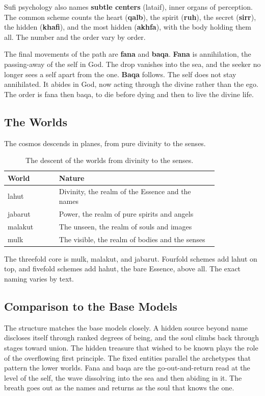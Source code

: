 Sufi psychology also names \textbf{subtle centers} (lataif), inner organs of
perception. The common scheme counts the heart (\textbf{qalb}), the spirit
(\textbf{ruh}), the secret (\textbf{sirr}), the hidden (\textbf{khafi}), and the
most hidden (\textbf{akhfa}), with the body holding them all. The number and
the order vary by order.

The final movements of the path are \textbf{fana} and \textbf{baqa}.
\textbf{Fana} is annihilation, the passing-away of the self in God. The drop
vanishes into the sea, and the seeker no longer sees a self apart from the one.
\textbf{Baqa} follows. The self does not stay annihilated. It abides in God,
now acting through the divine rather than the ego. The order is fana then baqa,
to die before dying and then to live the divine life.

\subsection{The Worlds}

The cosmos descends in planes, from pure divinity to the senses.

\begin{longtable}{L{0.20\linewidth} L{0.62\linewidth}}
\caption{The descent of the worlds from divinity to the senses.}\\
\toprule
World & Nature \\
\midrule
lahut & Divinity, the realm of the Essence and the names \\
jabarut & Power, the realm of pure spirits and angels \\
malakut & The unseen, the realm of souls and images \\
mulk & The visible, the realm of bodies and the senses \\
\bottomrule
\end{longtable}

The threefold core is mulk, malakut, and jabarut. Fourfold schemes add lahut on
top, and fivefold schemes add hahut, the bare Essence, above all. The exact
naming varies by text.

\subsection{Comparison to the Base Models}

The structure matches the base models closely. A hidden source beyond name
discloses itself through ranked degrees of being, and the soul climbs back
through stages toward union. The hidden treasure that wished to be known plays
the role of the overflowing first principle. The fixed entities parallel the
archetypes that pattern the lower worlds. Fana and baqa are the
go-out-and-return read at the level of the self, the wave dissolving into the
sea and then abiding in it. The breath goes out as the names and returns as the
soul that knows the one.
